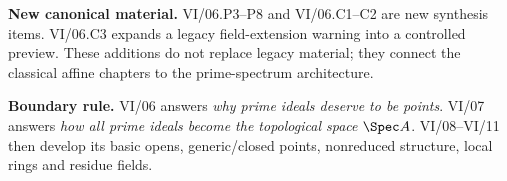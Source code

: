 \bigskip
\noindent\textbf{New canonical material.}
VI/06.P3--P8 and VI/06.C1--C2 are new synthesis items.  VI/06.C3 expands a legacy
field-extension warning into a controlled preview.  These additions do not replace legacy
material; they connect the classical affine chapters to the prime-spectrum architecture.

\bigskip
\noindent\textbf{Boundary rule.}
VI/06 answers \emph{why prime ideals deserve to be points}.  VI/07 answers \emph{how all
prime ideals become the topological space $\Spec A$}.  VI/08--VI/11 then develop its basic
opens, generic/closed points, nonreduced structure, local rings and residue fields.
